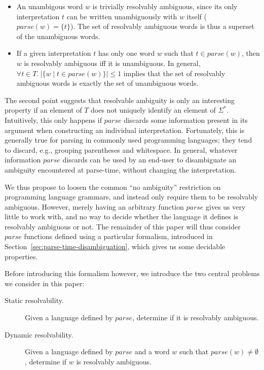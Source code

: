 \documentclass[acmsmall,review,anonymous]{acmart}\settopmatter{printfolios=true,printccs=false,printacmref=false}
\newcommand{\T}{\Sigma} %
\newcommand{\parse}{\mathit{parse}} %
\begin{document}
\begin{itemize}
\item An unambigous word $w$ is trivially resolvably ambiguous, since its only interpretation $t$ can be written unambiguously with $w$ itself ($\parse(w) = \{t\}$). The set of resolvably ambiguous words is thus a superset of the unambiguous words.
\item If a given interpretation $t$ has only one word $w$ such that $t \in \parse(w)$, then $w$ is resolvably ambiguous iff it is unambiguous. In general, $\forall t \in T.\ \lvert\{w \mid t \in \parse(w)\}\rvert \leq 1$ implies that the set of resolvably ambiguous words is exactly the set of unambiguous words.
\end{itemize}

\noindent The second point suggests that resolvable ambiguity is only an interesting property if an element of $T$ does not uniquely identify an element of $\T^{*}$. Intuitively, this only happens if $\parse$ discards some information present in its argument when constructing an individual interpretation. Fortunately, this is generally true for parsing in commonly used programming languages; they tend to discard, e.g., grouping parentheses and whitespace. In general, whatever information $\parse$ discards can be used by an end-user to disambiguate an ambiguity encountered at parse-time, without changing the interpretation.

We thus propose to loosen the common ``no ambiguity'' restriction on programming language grammars, and instead only require them to be resolvably ambiguous. However, merely having an arbitrary function $\parse$ gives us very little to work with, and no way to decide whether the language it defines is resolvably ambiguous or not. The remainder of this paper will thus consider $\parse$ functions defined using a particular formalism, introduced in Section~\ref{sec:parse-time-disambiguation}, which gives us some decidable properties.

Before introducing this formalism however, we introduce the two central problems we consider in this paper:

\begin{description}
\item[Static resolvability.] Given a language defined by $\parse$, determine if it is resolvably ambiguous.
\item[Dynamic resolvability.] Given a language defined by $\parse$ and a word $w$ such that $\parse(w) \neq \emptyset$, determine if $w$ is resolvably ambiguous.
\end{description}
\end{document}
